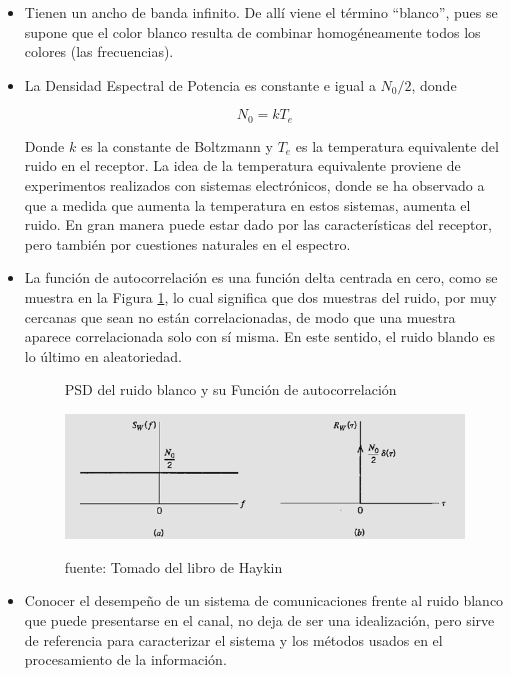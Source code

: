\begin{itemize}
	
	\item  Tienen un ancho de banda infinito. De allí viene el término “blanco”, pues se supone que el color blanco resulta de combinar homogéneamente todos los colores (las frecuencias).
	\item  La Densidad Espectral de Potencia es constante e igual a $N_0/2$, donde 

\begin{equation} \label{equ_treintanueve}
		 N_0 = kT_e
\end{equation}

Donde $k$ es la constante de Boltzmann y $T_e$ es la temperatura equivalente del ruido en el receptor. La idea de la temperatura equivalente proviene de experimentos realizados con sistemas electrónicos, donde se ha observado a que a medida que aumenta la temperatura en estos sistemas, aumenta el ruido. En gran manera puede estar dado por las características del receptor, pero también por cuestiones naturales en el espectro.

	\item  La función de autocorrelación es una función delta centrada en cero, como se muestra en la Figura \ref{fig:Funcion}, lo cual significa que dos muestras del ruido, por muy cercanas que sean no están correlacionadas, de modo que una muestra aparece correlacionada solo con sí misma. En este sentido, el ruido blando es lo último en aleatoriedad.
	
	\begin{figure}[h!]
		\captionsetup{justification = raggedright, singlelinecheck = false}
		\caption {PSD del ruido blanco y su Función de autocorrelación} 
		\centering
		\includegraphics[scale=0.9]{Imagenes/Funcion.png}
		\label{fig:Funcion}
				\caption*{fuente: Tomado del libro de Haykin}
	\end{figure}
	\item  Conocer el desempeño de un sistema de comunicaciones frente al ruido blanco que puede presentarse en el canal, no deja de ser una idealización, pero sirve de referencia para caracterizar el sistema y los métodos usados en el procesamiento de la información.  
\end{itemize}



